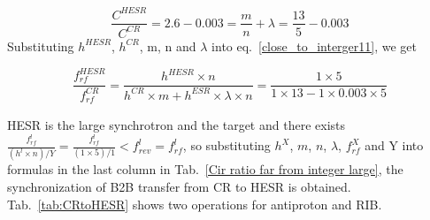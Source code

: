 \begin{equation}
\frac{C^{\mathit{HESR}}}{C^{\mathit{CR}}}=2.6-0.003=\frac{m}{n}+ \lambda = \frac{13}{5}-0.003
\end{equation}
Substituting $h^{\mathit{HESR}}$, $h^{\mathit{CR}}$, m, n and $\lambda$ into eq.~\ref{close_to_interger11}, we get

\begin{equation} 
\frac{f_{\mathit{rf}}^{\mathit{HESR}}}{f_{\mathit{rf}}^{\mathit{CR}}}=\frac{h^{\mathit{HESR}}\times n}{h^{\mathit{CR}} \times m+ h^{\mathit{ESR}} \times\lambda\times n}=\frac{1\times 5}{1 \times 13- 1 \times 0.003\times 5}
\end{equation}

HESR is the large synchrotron and the target and there exists $\frac{f_{\mathit{rf}}^{l}}{(h^l\times n)/Y}=\frac{f_{\mathit{rf}}^{l}}{(1\times 5)/1}<f_{\mathit{rev}}^{l}=f_{\mathit{rf}}^{l}$, so substituting $h^X$, $m$, $n$, $\lambda$, $f_{\mathit{rf}}^{X}$ and Y into formulas in the last column in Tab.~\ref{Cir ratio far from integer large}, the synchronization of B2B transfer from CR to HESR is obtained. Tab.~\ref{tab:CRtoHESR} shows two operations for antiproton and RIB.


